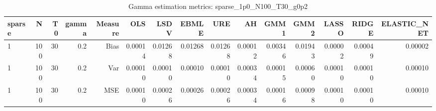 \begin{table}[!htbp]\centering
\caption{Gamma estimation metrics: sparse_1p0_N100_T30_g0p2}
\label{tab:table1_sparse_1p0_N100_T30_g0p2}
\begin{tabular}{lrrrrrrrrrrrrrr}
\hline
sparse & N & T0 & gamma & Measure & OLS & LSDV & EBMLE & URE & AH & GMM1 & GMM2 & LASSO & RIDGE & ELASTIC_NET \\
\hline
1 & 100 & 30 & 0.2 & Bias & 0.00014 & 0.01268 & 0.01268 & 0.01268 & 0.00012 & 0.00346 & 0.01943 & 0.00002 & 0.00049 & 0.00002 \\
1 & 100 & 30 & 0.2 & Var & 0.00010 & 0.00010 & 0.00010 & 0.00010 & 0.00034 & 0.00015 & 0.00060 & 0.00010 & 0.00010 & 0.00010 \\
1 & 100 & 30 & 0.2 & MSE & 0.00010 & 0.00026 & 0.00026 & 0.00026 & 0.00034 & 0.00016 & 0.00098 & 0.00010 & 0.00010 & 0.00010 \\
\hline
\end{tabular}
\end{table}

